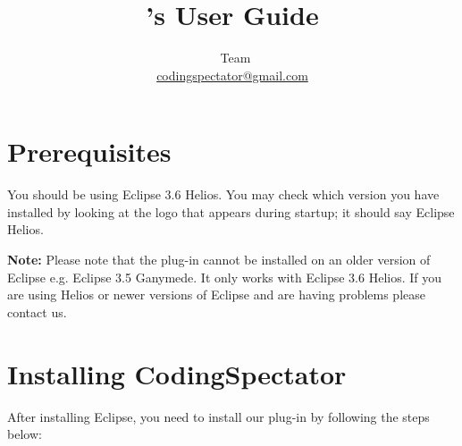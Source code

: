 \documentclass{article}
\title{\codspec's User Guide}
\author{\codspec\
Team\\\href{mailto:codingspectator@gmail.com}{codingspectator@gmail.com}}
\newcommand\codspec{CodingSpectator}
\newcommand\warnnote[1]{\textbf{Note: }#1}
\begin{document}
%
\maketitle
%
\tableofcontents
%
\section{Prerequisites}
%
You should be using Eclipse 3.6 Helios. You may check which version you have
installed by looking at the logo that appears during startup; it should say
Eclipse Helios.

\warnnote{Please note that the plug-in cannot be installed on an older version
of Eclipse e.g. Eclipse 3.5 Ganymede. It only works with Eclipse 3.6 Helios. If
you are using Helios or newer versions of Eclipse and are having problems please
contact us.}
%
\section{Installing \codspec}

After installing Eclipse, you need to install our plug-in by following the steps
below:
\end{document}
